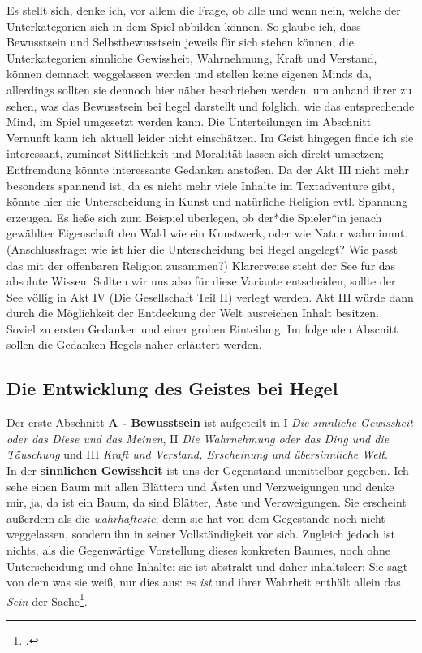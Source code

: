 \documentclass[12pt, a4paper, openany]{report}
\begin{document}
Es stellt sich, denke ich, vor allem die Frage, ob alle und wenn nein, welche der Unterkategorien sich in dem Spiel abbilden können. 
So glaube ich, dass Bewusstsein und Selbstbewusstsein jeweils für sich stehen können, die Unterkategorien sinnliche Gewissheit, Wahrnehmung, Kraft und Verstand, können demnach weggelassen werden und stellen keine eigenen Minds da, allerdings sollten sie dennoch hier näher beschrieben werden, um anhand ihrer zu sehen, was das Bewusstsein bei hegel darstellt und folglich, wie das entsprechende Mind, im Spiel umgesetzt werden kann.
Die Unterteilungen im Abschnitt \glqq Vernunft\grqq{} kann ich aktuell leider nicht einschätzen. Im Geist hingegen finde ich sie interessant, zuminest Sittlichkeit und Moralität lassen sich direkt umsetzen; Entfremdung könnte interessante Gedanken anstoßen.
Da der Akt III nicht mehr besonders spannend ist, da es nicht mehr viele Inhalte im Textadventure gibt, könnte hier die Unterscheidung in Kunst und natürliche Religion evtl. Spannung erzeugen. 
Es ließe sich zum Beispiel überlegen, ob der*die Spieler*in jenach gewählter Eigenschaft den Wald wie ein Kunstwerk, oder wie Natur wahrnimmt. 
(Anschlussfrage: wie ist hier die Unterscheidung bei Hegel angelegt? Wie passt das mit der offenbaren Religion zusammen?)
Klarerweise steht der See für das absolute Wissen. 
Sollten wir uns also für diese Variante entscheiden, sollte der See völlig in Akt IV (Die Gesellschaft Teil II) verlegt werden.
Akt III würde dann durch die Möglichkeit der Entdeckung der Welt ausreichen Inhalt besitzen.\\

Soviel zu ersten Gedanken und einer groben Einteilung. 
Im folgenden Abscnitt sollen die Gedanken Hegels näher erläutert werden.

\subsection{Die Entwicklung des Geistes bei Hegel}
Der erste Abschnitt \textbf{A - Bewusstsein} ist aufgeteilt in I \textit{Die sinnliche Gewissheit oder das Diese und das Meinen}, II \textit{Die Wahrnehmung oder das Ding und die Täuschung} und III \textit{Kraft und Verstand, Erscheinung und übersinnliche Welt}. \\

In der \textbf{sinnlichen Gewissheit} ist uns der Gegenstand unmittelbar gegeben. 
Ich sehe einen Baum mit allen Blättern und Ästen und Verzweigungen und denke mir, ja, da ist ein Baum, da sind Blätter, Äste und Verzweigungen.
\glqq Sie erscheint außerdem als die \textit{wahrhafteste}; denn sie hat von dem Gegestande noch nicht weggelassen, sondern ihn in seiner Vollständigkeit vor sich.\grqq{}
Zugleich jedoch ist nichts, als die Gegenwärtige Vorstellung dieses konkreten Baumes, noch ohne Unterscheidung und ohne Inhalte: sie ist abstrakt und daher inhaltsleer: 
\glqq Sie sagt von dem was sie weiß, nur dies aus: es \textit{ist} und ihrer Wahrheit enthält allein das \textit{Sein} der Sache\grqq\footcite[][82]{hegel_phanomenologie_2017}.
\end{document}
